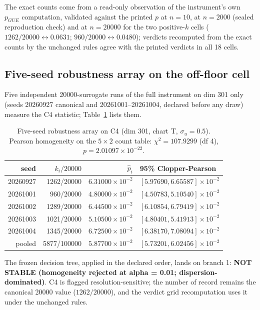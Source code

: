 \documentclass[11pt]{article}
\begin{document}
The exact counts come from a read-only observation of the instrument's
own $p_{GUE}$ computation, validated against the printed $p$ at
$n = 10$, at $n = 2000$ (sealed reproduction check) and at $n = 20000$
for the two positive-$k$ cells ($1262/20000 \leftrightarrow 0.0631$;
$960/20000 \leftrightarrow 0.0480$); verdicts recomputed from the exact
counts by the unchanged rules agree with the printed verdicts in all 18
cells.

\subsection{Five-seed robustness array on the off-floor cell}

Five independent 20000-surrogate runs of the full instrument on dim 301
only (seeds 20260927 canonical and 20261001--20261004, declared before
any draw) measure the C4 statistic; Table~\ref{tab:array} lists them.

\begin{table}[htbp]\centering\small
\begin{tabular}{@{}r r r l@{}}
\toprule
seed & $k_i/20000$ & $\hat p_i$ & 95\% Clopper-Pearson \\
\midrule
20260927 & 1262/20000 & $6.31000\times 10^{-2}$ & $[5.97690, 6.65587]\times 10^{-2}$ \\
20261001 & 960/20000 & $4.80000\times 10^{-2}$ & $[4.50783, 5.10540]\times 10^{-2}$ \\
20261002 & 1289/20000 & $6.44500\times 10^{-2}$ & $[6.10854, 6.79419]\times 10^{-2}$ \\
20261003 & 1021/20000 & $5.10500\times 10^{-2}$ & $[4.80401, 5.41913]\times 10^{-2}$ \\
20261004 & 1345/20000 & $6.72500\times 10^{-2}$ & $[6.38170, 7.08094]\times 10^{-2}$ \\
\midrule
pooled & 5877/100000 & $5.87700\times 10^{-2}$ & $[5.73201, 6.02456]\times 10^{-2}$ \\
\bottomrule
\end{tabular}
\caption{Five-seed robustness array on C4 (dim 301, chart T,
$\sigma_u = 0.5$). Pearson homogeneity on the $5\times 2$ count table:
$\chi^2 = 107.9299$ (df 4), $p = 2.01097\times 10^{-22}$.}
\label{tab:array}
\end{table}

The frozen decision tree, applied in the declared order, lands on
branch 1: \textbf{NOT STABLE (homogeneity rejected at alpha = 0.01;
dispersion-dominated)}. C4 is flagged resolution-sensitive; the number
of record remains the canonical 20000 value ($1262/20000$), and the
verdict grid recomputation uses it under the unchanged rules.
\end{document}
